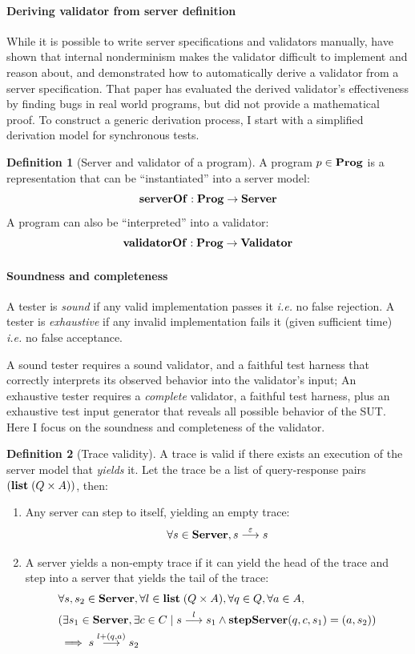\documentclass{article}
\theoremstyle{definition}
\newtheorem{definition}{Definition}
\newcommand{\Server}{\ottkw{Server}}
\newcommand{\Validator}{\ottkw{Validator}}
\newcommand{\stepServer}{\ottkw{stepServer}}
\newcommand{\List}{\ottkw{list}\;}
\newcommand{\nil}{\varepsilon}
\newcommand{\yields}[3]{#1\overset{#2}{\longrightarrow}#3}
\newcommand{\Prog}{\ottkw{Prog}}
\newcommand{\serverOf}{\ottkw{serverOf}}
\newcommand{\validatorOf}{\ottkw{validatorOf}}
\begin{document}
\paragraph{Deriving validator from server definition}
While it is possible to write server specifications and validators manually,
\textcite{issta21} have shown that internal nonderminism makes the
validator difficult to implement and reason about, and demonstrated how to
automatically derive a validator from a server specification.  That paper has
evaluated the derived validator's effectiveness by finding bugs in real world
programs, but did not provide a mathematical proof.  To construct a generic
derivation process, I start with a simplified derivation model for synchronous
tests.

\begin{definition}[Server and validator of a program]
  A program $p\in\Prog$ is a representation that can be ``instantiated'' into a
  server model:
  \[ \serverOf:\Prog\to\Server \]
  A program can also be ``interpreted'' into a validator:
  \[ \validatorOf:\Prog\to\Validator \]
\end{definition}

\paragraph{Soundness and completeness}
A tester is {\em sound} if any valid implementation passes it {\it i.e.} no
false rejection.  A tester is {\em exhaustive} if any invalid implementation
fails it (given sufficient time) {\it i.e.} no false acceptance.

A sound tester requires a sound validator, and a faithful test harness
that correctly interprets its observed behavior into the validator's input; An
exhaustive tester requires a {\em complete} validator, a faithful test harness,
plus an exhaustive test input generator that reveals all possible behavior of
the SUT.  Here I focus on the soundness and completeness of the validator.

\begin{definition}[Trace validity]
  A trace is valid if there exists an execution of the server model that {\em
    yields} it.  Let the trace be a list of query-response pairs $(\List
  (Q\times A))$, then:
  \begin{enumerate}
  \item Any server can step to itself, yielding an empty trace:
    \[\forall s\in\Server, \yields{s}{\nil}{s}\]
  \item A server yields a non-empty trace if it can yield the head of the trace
    and step into a server that yields the tail of the trace:
    \begin{align*}
      &\forall s,s_2\in\Server,\forall l\in\List(Q\times A),\forall q\in Q,\forall a\in A,\\
      &(\exists s_1\in\Server,\exists c\in C\mid\yields{s}{l}{s_1}\wedge
      \stepServer(q,c,s_1)=(a,s_2)) \\
      &\implies \yields{s}{l+(q,a)}{s_2}
    \end{align*}
  \end{enumerate}
\end{definition}
\end{document}
